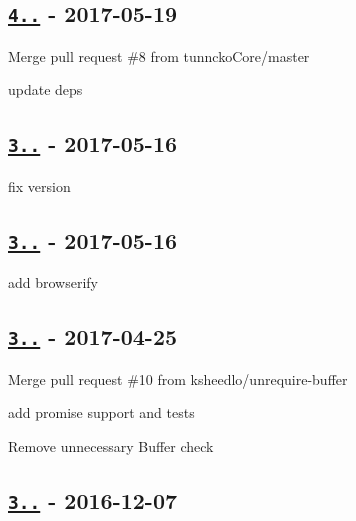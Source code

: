 \subsection*{\href{https://github.com/jonschlinkert/kind-of/compare/3.2.2...4.0.0}{\tt 4..} -\/ 2017-\/05-\/19}


\begin{DoxyItemize}
\item Merge pull request \#8 from tunncko\+Core/master
\item update deps
\end{DoxyItemize}

\subsection*{\href{https://github.com/jonschlinkert/kind-of/compare/3.2.1...3.2.2}{\tt 3..} -\/ 2017-\/05-\/16}


\begin{DoxyItemize}
\item fix version
\end{DoxyItemize}

\subsection*{\href{https://github.com/jonschlinkert/kind-of/compare/3.2.0...3.2.1}{\tt 3..} -\/ 2017-\/05-\/16}


\begin{DoxyItemize}
\item add browserify
\end{DoxyItemize}

\subsection*{\href{https://github.com/jonschlinkert/kind-of/compare/3.1.0...3.2.0}{\tt 3..} -\/ 2017-\/04-\/25}


\begin{DoxyItemize}
\item Merge pull request \#10 from ksheedlo/unrequire-\/buffer
\item add {\ttfamily promise} support and tests
\item Remove unnecessary {\ttfamily Buffer} check
\end{DoxyItemize}

\subsection*{\href{https://github.com/jonschlinkert/kind-of/compare/3.0.4...3.1.0}{\tt 3..} -\/ 2016-\/12-\/07}


